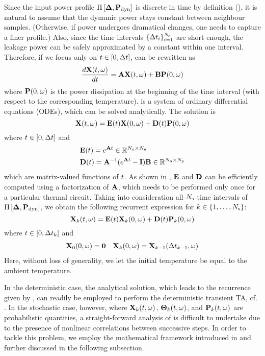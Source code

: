Since the input power profile $\prof{\mP_\dyn}$ is discrete in time by definition (), it is natural to assume that the dynamic power stays constant between neighbour samples. (Otherwise, if power undergoes dramatical changes, one needs to capture a finer profile.) Also, since the time intervals $\{ \Delta t_i \}_{i = 1}^{N_\text{s}}$ are short enough, the leakage power can be safely approximated by a constant within one interval. Therefore, if we focus only on $t \in [0, \Delta t]$,  can be rewritten as
\begin{equation} \elabel{fourier-ode}
  \frac{d\vX(\t, \o)}{d\t} = \mA \vX(\t, \o) + \mB \vP(0, \o)
\end{equation}
where $\mathbf{P}(0, \omega)$ is the power dissipation at the beginning of the time interval (with respect to the corresponding temperature).  is a system of ordinary differential equations (ODEs), which can be solved analytically. The solution is
\begin{equation} \elabel{ode-solution}
  \vX(\t, \o) = \mE(\t) \vX(0, \o) + \mD(\t) \vP(0, \o)
\end{equation}
where $t \in [0, \Delta t]$ and
\begin{align}
  & \mE(\t) = e^{\mA \t} \in \real^{\nodes \times \nodes} \elabel{e} \\
  & \mD(\t) = \mA^{-1} (e^{\mA \t} - \mI) \mB \in \real^{\nodes \times \cores} \elabel{d}
\end{align}
which are matrix-valued functions of $t$. As shown in \cite{ukhov2012}, $\mE$ and $\mD$ can be efficiently computed using a factorization of $\mA$, which needs to be performed only once for a particular thermal circuit. Taking into consideration all $N_\text{s}$ time intervals of $\prof{\mP_\dyn}$, we obtain the following recurrent expression for $k \in \{ 1, \dotsc, N_\text{s} \}$:
\begin{equation} \elabel{recurrence}
  \vX_k(\t, \o) = \mE(\t) \vX_k(0, \o) + \mD(\t) \vP_k(0, \o)
\end{equation}
where $t \in [ 0, \Delta t_k ]$ and
\begin{align*}
  & \mathbf{X}_0(0, \omega) = \mathbf{0} & \mathbf{X}_k(0, \omega) = \mathbf{X}_{k - 1}(\Delta t_{k - 1}, \omega)
\end{align*}
Here, without loss of generality, we let the initial temperature be equal to the ambient temperature.

In the deterministic case, the analytical solution, which leads to the recurrence given by , can readily be employed to perform the deterministic transient TA, cf. \cite{ukhov2012}. In the stochastic case, however, where $\mathbf{X}_k(t, \omega)$, ${\boldsymbol\Theta}_k(t, \omega)$, and $\mathbf{P}_k(t, \omega)$ are probabilistic quantities, a straight-forward analysis of  is difficult to undertake due to the presence of nonlinear correlations between successive steps. In order to tackle this problem, we employ the mathematical framework introduced in  and further discussed in the following subsection.
